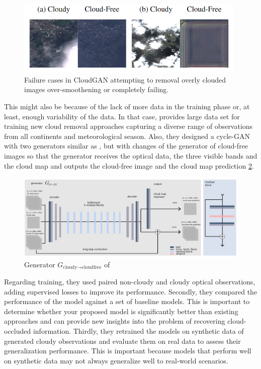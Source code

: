 \documentclass[../main.tex]{subfiles}
\begin{document}
\begin{figure}[H]
	\centering
	\includegraphics[width=11cm]{imgs/relatedwork/cycle-gan-fail.png}
	\caption{Failure cases in CloudGAN attempting to removal overly clouded images over-smoothening or completely failing.}
	\label{fig:related-cloudy-gan-fail}
\end{figure}
This might also be because of the lack of more data in the training phase or, at least, enough variability of the data. In that case, \cite{sen12mscr} provides  large data
set for training new cloud removal approaches capturing a diverse range of observations from all continents
and meteorological season. Also, they designed a cycle-GAN with two generators similar as \cite{}, but with changes of the generator of cloud-free images so that the generator receives the optical data, the three visible bands and the cloud map and outputs the cloud-free image and the cloud map prediction \ref{fig:sen12mscr-gen}. 
\begin{figure}[H]
	\centering
	\includegraphics[width=13cm]{imgs/relatedwork/sen12mscr-gen-model}
	\caption{Generator $G_{\text{cloudy} \rightarrow \text{cloudfree}}$ of \cite{sen12mscr}}
	\label{fig:sen12mscr-gen}
\end{figure}
Regarding training, they used paired non-cloudy and cloudy optical observations, adding supervised losses to improve its performance. Secondly, they compared the performance of the model against a set of baseline models. This is important to determine whether your proposed model is significantly better than existing approaches and can provide new insights into the problem of recovering cloud-occluded information.
Thirdly, they retrained the models on synthetic data of generated cloudy observations and evaluate them on real data to assess their generalization performance. This is important because models that perform well on synthetic data may not always generalize well to real-world scenarios. 
\end{document}
